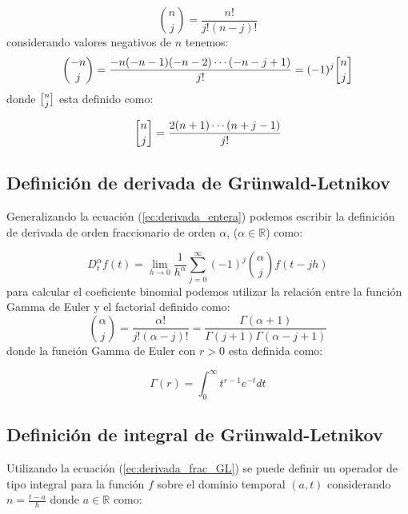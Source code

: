 	\begin{equation}
		\binom{n}{j} = \frac{n!}{j! (n-j)! } 
	\end{equation}
	considerando valores negativos de $n$ tenemos:
	\begin{equation}
		\binom{-n}{j} = \frac{-n(-n-1)(-n-2) \cdots (-n -j +1 )}{j!}= (-1)^{j} \binomb{n}{j}
		\label{ec:binomio_n}
	\end{equation}
	donde $\binomb{n}{j}$ esta definido como:
			
	\begin{equation}
		\binomb{n}{j} = \frac{2(n+1) \cdots (n+j-1)}{j!}
	\end{equation}
	
		\subsection{Definición de derivada de Grünwald-Letnikov}
		
	Generalizando la ecuación (\ref{ec:derivada_entera}) podemos escribir la definición de derivada de orden fraccionario de orden  $\alpha$, ($\alpha \in \mathbb{R}$) como:
		
	\begin{equation}
		D^{\alpha}_{t} f(t) = \lim_{h \to 0} \frac{1}{h^{\alpha}}   \sum_{j = 0}^{\infty} (-1)^{j} \binom{\alpha}{j} f(t - jh)
		\label{ec:derivada_frac_GL}
	\end{equation}
	para calcular el coeficiente binomial podemos utilizar la relación entre la función Gamma de Euler y el factorial definido como:
	\begin{equation}
		\binom{\alpha}{j}  = \frac{\alpha!}{j! (\alpha-j)!} = \frac{\Gamma (\alpha + 1)}{\Gamma(j+1) \Gamma(\alpha - j + 1)}
	\end{equation}
	donde la función Gamma de Euler con $r>0$ esta definida como:
			
	\begin{equation}
		\Gamma(r) = \int^{\infty}_{0} t^{r-1} e^{-t}dt
	\end{equation}
			
		\subsection{Definición de integral de Grünwald-Letnikov}
		
	Utilizando la ecuación (\ref{ec:derivada_frac_GL}) se puede definir un operador de tipo integral para la función $f$  sobre el dominio temporal $(a,t)$ considerando $n = \frac{t-a}{h}$ donde $a \in \mathbb{R}$ como:
			
